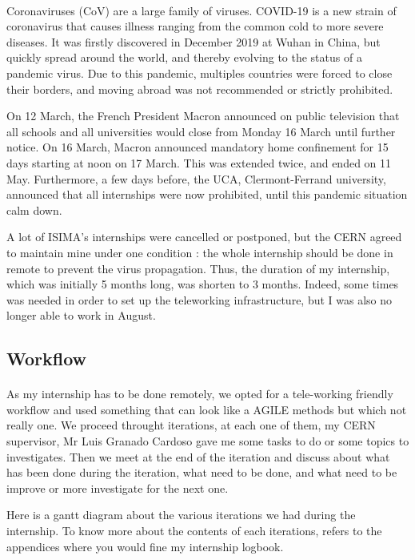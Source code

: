 \documentclass[../main.tex]{subfiles}
\begin{document}
\paragraph{}
Coronaviruses (CoV) are a large family of viruses. COVID-19 is a new strain of coronavirus that causes illness ranging from the common cold to more severe diseases. It was firstly discovered in December 2019 at Wuhan in China, but quickly spread around the world, and thereby evolving to the status of a pandemic virus. Due to this pandemic, multiples countries were forced to close their borders, and moving abroad was not recommended or strictly prohibited.
\par \noindent \newline
On 12 March, the French President Macron announced on public television that all schools and all universities would close from Monday 16 March until further notice. On 16 March, Macron announced mandatory home confinement for 15 days starting at noon on 17 March. This was extended twice, and ended on 11 May. Furthermore, a few days before, the UCA, Clermont-Ferrand university, announced that all internships were now prohibited, until this pandemic situation calm down.
\par \noindent \newline
A lot of ISIMA's internships were cancelled or postponed, but the CERN agreed to maintain mine under one condition : the whole internship should be done in remote to prevent the virus propagation.
Thus, the duration of my internship, which was initially 5 months long, was shorten to 3 months. Indeed, some times was needed in order to set up the teleworking infrastructure, but I was also no longer able to work in August.

\subsection{Workflow}
\paragraph{}
As my internship has to be done remotely, we opted for a tele-working friendly workflow and used something that can look like a AGILE methods but which not really one.
We proceed throught iterations, at each one of them, my CERN supervisor, Mr Luis Granado Cardoso gave me some tasks to do or some topics to investigates. Then we meet at the end of the iteration and discuss about what has been done during the iteration, what need to be done, and what need to be improve or more investigate for the next one.
\par \noindent \newline
Here is a gantt diagram about the various iterations we had during the internship.
To know more about the contents of each iterations, refers to the appendices where you would fine my internship logbook.
\end{document}
